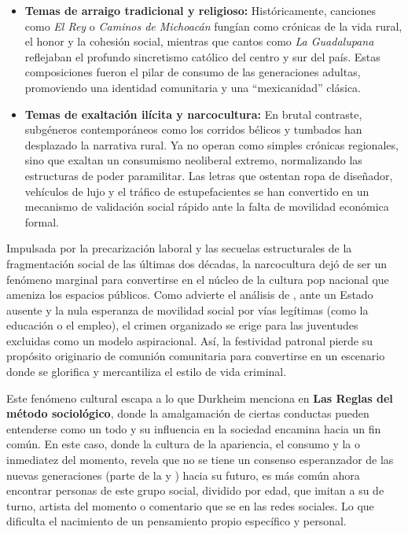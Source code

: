 \begin{itemize}
    \item \textbf{Temas de arraigo tradicional y religioso:} Históricamente, canciones como \textit{El Rey} o \textit{Caminos de Michoacán}
            fungían como crónicas de la vida rural, el honor y la cohesión social, mientras que cantos como \textit{La Guadalupana}
            reflejaban el profundo sincretismo católico del centro y sur del país. Estas composiciones fueron el pilar de consumo de
            las generaciones adultas, promoviendo una identidad comunitaria y una ``mexicanidad'' clásica.

    \item \textbf{Temas de exaltación ilícita y narcocultura:} En brutal contraste, subgéneros contemporáneos como los corridos
            bélicos y tumbados han desplazado la narrativa rural. Ya no operan como simples crónicas regionales, sino que exaltan
            un consumismo neoliberal extremo, normalizando las estructuras de poder paramilitar. Las letras que ostentan ropa de
            diseñador, vehículos de lujo y el tráfico de estupefacientes se han convertido en un mecanismo de validación social
            rápido ante la falta de movilidad económica formal.
\end{itemize}

Impulsada por la precarización laboral y las secuelas estructurales de la fragmentación social de las últimas dos décadas,
la narcocultura dejó de ser un fenómeno marginal para convertirse en el núcleo de la cultura pop nacional que ameniza los
espacios públicos. Como advierte el análisis de \cite{bravo2025narcocorridos}, ante un Estado ausente y la nula esperanza
de movilidad social por vías legítimas (como la educación o el empleo), el crimen organizado se erige para las juventudes
excluidas como un modelo aspiracional. Así, la festividad patronal pierde su propósito originario de comunión comunitaria
para convertirse en un escenario donde se glorifica y mercantiliza el estilo de vida criminal.

Este fenómeno cultural escapa a lo que Durkheim menciona en \textbf{Las Reglas del método sociológico}, donde la amalgamación de
ciertas conductas pueden entenderse como un todo y su influencia en la sociedad encamina hacia un fin común. En este caso, donde la
cultura de la apariencia, el consumo y la  o inmediatez del momento, revela que no se tiene un consenso
esperanzador de las nuevas generaciones (parte de la  y ) hacia su futuro,
es más común ahora encontrar personas de este grupo social, dividido por edad, que imitan a su  de turno,
artista del momento o comentario que se  en las redes sociales. Lo que dificulta el nacimiento de un
pensamiento propio específico y personal.

